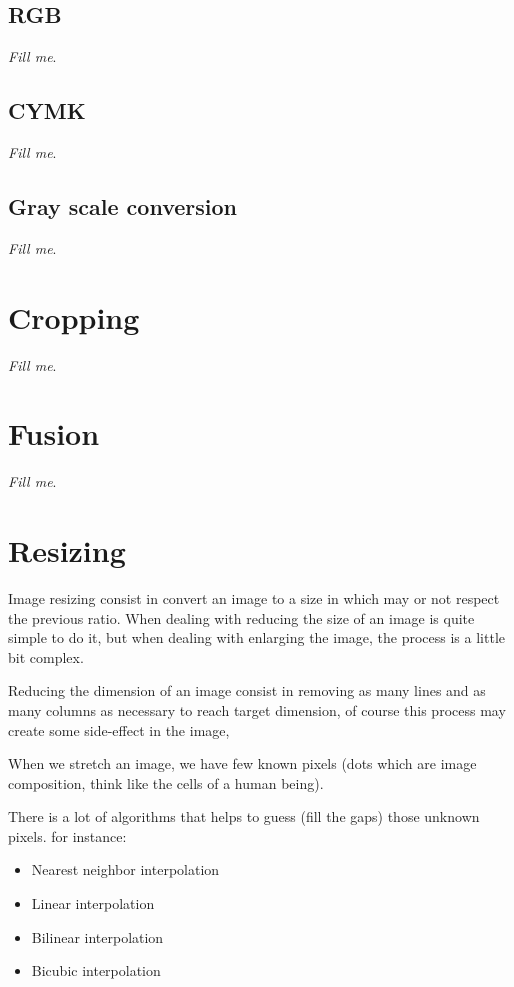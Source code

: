 \documentclass{article}
\begin{document}
	\subsection{RGB}
		
		\textit{Fill me}.

	\subsection{CYMK}

		\textit{Fill me}.

	\subsection{Gray scale conversion}

		\textit{Fill me}.

\section{Cropping}

	\textit{Fill me}.

\section{Fusion}

	\textit{Fill me}.

\section{Resizing}

	Image resizing consist in convert an image to a size in which may or not respect the previous ratio.
	When dealing with reducing the size of an image is quite simple to do it, but when dealing with enlarging 
	the image, the process is a little bit complex.

	Reducing the dimension of an image consist in removing as many lines and as many columns as necessary to reach target dimension, of course this
	process may create some side-effect in the image, 

	When we stretch an image, we have few known pixels (dots which are image composition, think like the cells of a human being).

	There is a lot of algorithms that helps to guess (fill the gaps) those unknown pixels. for instance:

	\begin{itemize}
	  \item Nearest neighbor interpolation
	  \item Linear interpolation
	  \item Bilinear interpolation
	  \item Bicubic interpolation
	\end{itemize}
\end{document}
